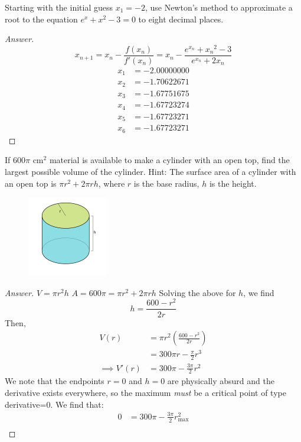 \documentclass[11pt]{exam}
\begin{document}
\begin{questions}

\addpoints
\question[3] Starting with the initial guess $x_1=-2$, use Newton's method to approximate a root to the equation $e^x+x^2-3=0$ to eight decimal places.
\begin{proof}[Answer]
	$$x_{n+1}=x_n-\frac{f(x_n)}{f'(x_{n})}=x_n-\frac{e^{x_n}+{x_n}^2-3}{e^{x_n}+2{x_n}}$$
	\begin{align*}
	x_1&=-2.00000000\\x_2&= -1.70622671\\x_3&= -1.67751675\\x_4&= -1.67723274\\x_5&= -1.67723271\\ x_6&=
	-1.67723271
	\end{align*}
\end{proof}
\newpage
\addpoints
\question[4] 
If $600\pi$ cm${}^2$ material is available to make a cylinder with an open top, find the largest possible volume of the cylinder.\newline
Hint: The surface area of a cylinder with an open top is $\pi r^2+2 \pi r h$, where $r$ is the base radius, $h$ is the height.
\begin{figure}[h!]
\includegraphics[right]{cyldiag}
\end{figure}
\begin{proof}[Answer]
	\noindent$V=\pi r^2h$\newline
	$A=600\pi=\pi r^2+2\pi r h$
	Solving the above for $h$, we find $$h=\frac{600-r^2}{2r}$$
	Then, \begin{align*}V(r)&=\pi r^2\left(\frac{600-r^2}{2r}\right)\\
	&=300\pi r-\frac{\pi}{2}r^3\\
	\implies V'(r)&=300\pi-\frac{3\pi}{2}r^2\end{align*}
	We note that the endpoints $r=0$ and $h=0$ are physically absurd and the derivative exists everywhere, so the maximum \emph{must} be a critical point of type derivative=0. We find that:\begin{align*}
		0&=300\pi-\frac{3\pi}{2}r_{\max}^2\\

\end{align*}
\end{proof}
\end{questions}
\end{document}
